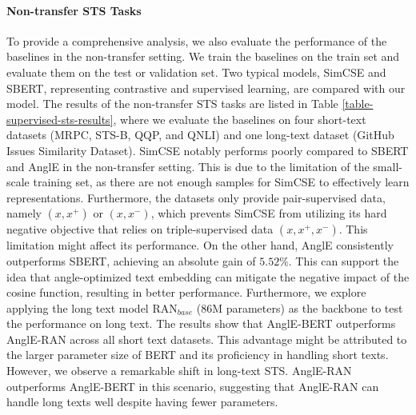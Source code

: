 \documentclass{article} \usepackage{iclr2024_conference,times}
\begin{document}
\paragraph{Non-transfer STS Tasks} To provide a comprehensive analysis, we also evaluate the performance of the baselines in the non-transfer setting. We train the baselines on the train set and evaluate them on the test or validation set. Two typical models, SimCSE and SBERT, representing contrastive and supervised learning, are compared with our model. The results of the non-transfer STS tasks are listed in Table \ref{table-supervised-sts-results}, where we evaluate the baselines on four short-text datasets (MRPC, STS-B, QQP, and QNLI) and one long-text dataset (GitHub Issues Similarity Dataset). SimCSE notably performs poorly compared to SBERT and AnglE in the non-transfer setting. This is due to the limitation of the small-scale training set, as there are not enough samples for SimCSE to effectively learn representations. Furthermore, the datasets only provide pair-supervised data, namely $(x, x^+)$ or $(x, x^-)$, which prevents SimCSE from utilizing its hard negative objective that relies on triple-supervised data $(x, x^+, x^-)$. This limitation might affect its performance. On the other hand, AnglE consistently outperforms SBERT, achieving an absolute gain of $5.52\%$. This can support the idea that angle-optimized text embedding can mitigate the negative impact of the cosine function, resulting in better performance. Furthermore, we explore applying the long text model RAN$_{base}$ (86M parameters) \citep{li-etal-2023-recurrent} as the backbone to test the performance on long text. The results show that AnglE-BERT outperforms AnglE-RAN across all short text datasets. This advantage might be attributed to the larger parameter size of BERT and its proficiency in handling short texts. However, we observe a remarkable shift in long-text STS. AnglE-RAN outperforms AnglE-BERT in this scenario, suggesting that AnglE-RAN can handle long texts well despite having fewer parameters.
\end{document}
